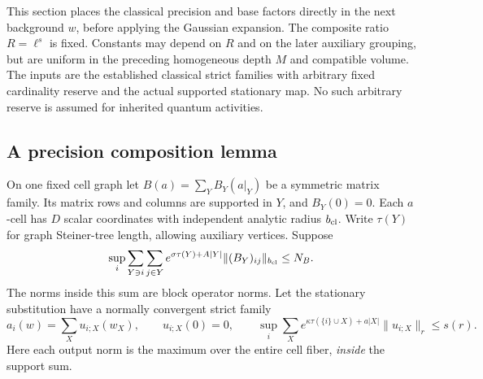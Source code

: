 \documentclass[11pt]{article}
\theoremstyle{remark}
\begin{document}
This section places the classical precision and base factors directly
in the next background $w$, before applying the Gaussian expansion.
The composite ratio $R=\ell^s$ is fixed. Constants may depend on
$R$ and on the later auxiliary grouping, but are uniform in the
preceding homogeneous depth $M$ and compatible volume. The inputs
are the established classical strict families with arbitrary fixed
cardinality reserve and the actual supported stationary map. No
such arbitrary reserve is assumed for inherited quantum activities.

\subsection{A precision composition lemma}
\label{cdc-precision-section}

On one fixed cell graph let
$B(a)=\sum_Y B_Y(a|_Y)$ be a symmetric matrix family. Its matrix
rows and columns are supported in $Y$, and $B_Y(0)=0$. Each
$a$-cell has $D$ scalar coordinates with independent analytic
radius $b_{\rm cl}$. Write $\tau(Y)$ for graph Steiner-tree length,
allowing auxiliary vertices. Suppose
\begin{equation}
 \sup_i\sum_{Y\ni i}\sum_{j\in Y}
 e^{\sigma\tau(Y)+A|Y|}
       \|(B_Y)_{ij}\|_{b_{\rm cl}}\leq N_B.
 \label{cdc-precision-input}
\end{equation}
The norms inside this sum are block operator norms. Let the
stationary substitution have a normally convergent strict family
\begin{equation}
 a_i(w)=\sum_X u_{i;X}(w_X),\qquad u_{i;X}(0)=0,\qquad
 \sup_i\sum_Xe^{\kappa\tau(\{i\}\cup X)+a|X|}
                         \|u_{i;X}\|_r\leq s(r).
 \label{cdc-map-input}
\end{equation}
Here each output norm is the maximum over the entire cell fiber,
\emph{inside} the support sum.
\end{document}
